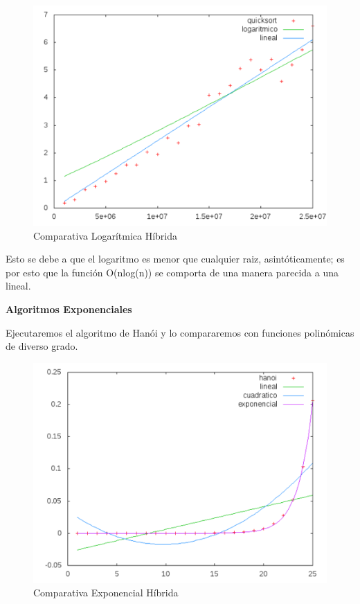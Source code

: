 \documentclass[a4paper, 11pt]{article}
\begin{document}
\begin{figure}[h]\includegraphics[width=13cm]{img/log_hibrida.pdf} \centering
	\caption{Comparativa Logarítmica Híbrida}\end{figure}

Esto se debe a que el logaritmo es menor que cualquier raiz, asintóticamente; es por esto que la función O(nlog(n)) se comporta de una manera parecida a una lineal.


\vspace{1cm}

\textbf{Algoritmos Exponenciales}

Ejecutaremos el algoritmo de Hanói y lo compararemos con funciones polinómicas de diverso grado.

\begin{figure}[h]\includegraphics[width=13cm]{img/expo_hibrida2.pdf} \centering
	\caption{Comparativa Exponencial Híbrida}\end{figure}
\end{document}
